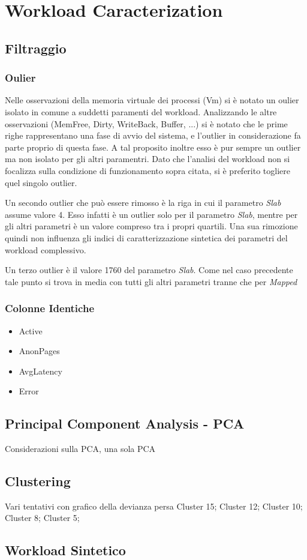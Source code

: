 \chapter{Workload Caracterization}

\section{Filtraggio}

\subsection{Oulier}
Nelle osservazioni della memoria virtuale dei processi (Vm) si è notato un oulier isolato in comune a suddetti paramenti del workload. Analizzando le altre osservazioni (MemFree, Dirty, WriteBack, Buffer, ...) si è notato che le prime righe rappresentano una fase di avvio del sistema, e l'outlier in considerazione fa parte proprio di questa fase. A tal proposito inoltre esso è pur sempre un outlier ma non isolato per gli altri paramentri. Dato che l'analisi del workload non si focalizza sulla condizione di funzionamento sopra citata, si è preferito togliere quel singolo outlier.

Un secondo outlier che può essere rimosso è la riga in cui il parametro \textit{Slab} assume valore 4. Esso infatti è un outlier solo per il parametro \textit{Slab}, mentre per gli altri parametri è un valore compreso tra i propri quartili. Una sua rimozione quindi non influenza gli indici di caratterizzazione sintetica dei parametri del workload complessivo.

Un terzo outlier è il valore 1760 del parametro \textit{Slab}. Come nel caso precedente tale punto si trova in media con tutti gli altri parametri tranne che per \textit{Mapped}

\subsection{Colonne Identiche}
\begin{itemize}
	\item Active
	\item AnonPages
	\item AvgLatency
	\item Error
\end{itemize}


\section{Principal Component Analysis - PCA}
Considerazioni sulla PCA, una sola PCA

\section{Clustering}
Vari tentativi con grafico della devianza persa
Cluster 15; Cluster 12; Cluster 10; Cluster 8; Cluster 5;

\section{Workload Sintetico}
